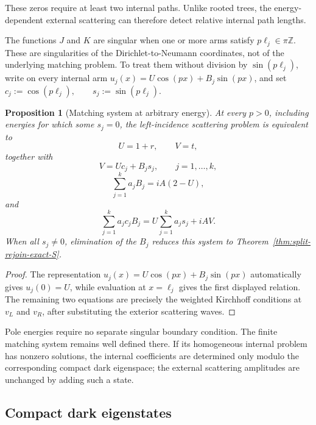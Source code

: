 \documentclass[11pt]{article}
\theoremstyle{plain}
\newtheorem{proposition}[theorem]{Proposition}
\theoremstyle{definition}
\begin{document}
These zeros require at least two internal paths. Unlike rooted trees, the
energy-dependent external scattering can therefore detect relative internal
path lengths.

The functions \(J\) and \(K\) are singular when one or more arms satisfy
\(p\ell_j\in\pi\mathbb Z\).
These are singularities of the Dirichlet-to-Neumann coordinates, not of the
underlying matching problem. To treat them without division by
\(\sin(p\ell_j)\), write on every internal arm
\(u_j(x) = U\cos(px)+B_j\sin(px)\),
and set
\(c_j:=\cos(p\ell_j), \qquad s_j:=\sin(p\ell_j)\).

\begin{proposition}[Matching system at arbitrary energy]
\label{prop:split-rejoin-pole-matching}
At every \(p>0\), including energies for which some \(s_j=0\), the
left-incidence scattering problem is equivalent to
\[
  U=1+r,
  \qquad
  V=t,
\]
together with
\[
  V=Uc_j+B_js_j,
  \qquad
  j=1,\ldots,k,
\]
\[
  \sum_{j=1}^{k}a_jB_j
  =
  iA(2-U),
\]
and
\[
  \sum_{j=1}^{k}a_jc_jB_j
  =
  U\sum_{j=1}^{k}a_js_j
  +
  iAV.
\]
When all \(s_j\neq0\), elimination of the \(B_j\) reduces this system to
Theorem~\ref{thm:split-rejoin-exact-S}.
\end{proposition}

\begin{proof}
The representation \(u_j(x)=U\cos(px)+B_j\sin(px)\) automatically gives \(u_j(0)=U\), while evaluation at \(x=\ell_j\) gives
the first displayed relation. The remaining two equations are precisely the
weighted Kirchhoff conditions at \(v_L\) and \(v_R\), after substituting
the exterior scattering waves.
\end{proof}

Pole energies require no separate singular boundary condition. The
finite matching system remains well defined there. If its homogeneous
internal problem has nonzero solutions, the internal coefficients are
determined only modulo the corresponding compact dark eigenspace; the
external scattering amplitudes are unchanged by adding such a state.

\subsection{Compact dark eigenstates}
\label{subsec:split-rejoin-dark-eigenstates}
\label{subsec:split-rejoin-equal-dark}
\label{subsec:split-rejoin-generic-dark}
\end{document}
